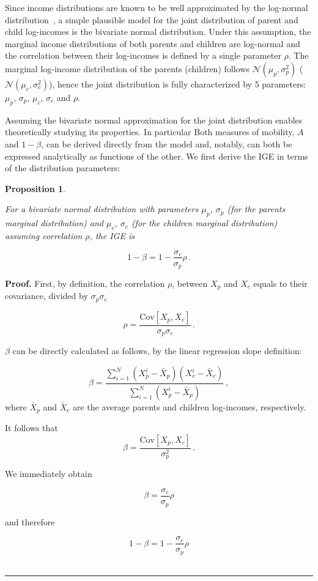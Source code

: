 \documentclass[prl,amsmath,twocolumn,nofootinbib]{revtex4}
\newcommand{\elabel}[1]{\label{eq:#1}}
\newcommand{\be}{\begin{equation}}
\newcommand{\ee}{\end{equation}}
\newtheorem{proposition}{Proposition}
\newenvironment{proof}[1][Proof]{\noindent\textbf{#1.} }{\ \rule{0.5em}{0.5em}}
\numberwithin{equation}{section}
\begin{document}
Since income distributions are known to be well approximated by the log-normal distribution~\cite{pinkovskiy2009parametric}, a simple plausible model for the joint distribution of parent and child log-incomes is the bivariate normal distribution. Under this assumption, the marginal income distributions of both parents and children are log-normal and the correlation between their log-incomes is defined by a single parameter $\rho$. The marginal log-income distribution of the parents (children) follows $\mathcal{N}\left(\mu_p,\sigma_p^2\right)$ ($\mathcal{N}\left(\mu_c,\sigma_c^2\right)$), hence the joint distribution is fully characterized by 5 parameters: $\mu_p$, $\sigma_p$, $\mu_c$, $\sigma_c$ and $\rho$.

Assuming the bivariate normal approximation for the joint distribution enables theoretically studying its properties. In particular Both measures of mobility, $A$ and $1-\beta$, can be derived directly from the model and, notably, can both be expressed analytically as functions of the other. We first derive the IGE in terms of the distribution parameters:

\begin{proposition}
\label{prop:prop1}

For a bivariate normal distribution with parameters $\mu_p$, $\sigma_p$ (for the parents marginal distribution) and $\mu_c$, $\sigma_c$ (for the children marginal distribution) assuming correlation $\rho$, the IGE is

\be
1-\beta = 1-\frac{\sigma_c}{\sigma_p}\rho \,.
\elabel{beta_rho}
\ee
\end{proposition}

\begin{proof}
First, by definition, the correlation $\rho$, between $X_p$ and $X_c$ equals to their covariance, divided by $\sigma_p\sigma_c$

\be
\rho = \frac{\text{Cov}\left[X_p,X_c\right]}{\sigma_p\sigma_c}\,.
\ee

$\beta$ can be directly calculated as follows, by the linear regression slope definition:

\be
\beta = \frac{\sum_{i=1}^{N} {\left(X_p^i - \bar{X}_p\right)\left(X_c^i - \bar{X}_c\right)}}{\sum_{i=1}^{N} {\left(X_p^i - \bar{X}_p\right)}}\,,
\ee
where $\bar{X}_p$ and $\bar{X}_c$ are the average parents and children log-incomes, respectively.

It follows that 
\be
\beta = \frac{\text{Cov}\left[X_p,X_c\right]}{\sigma_p^2}\,.
\ee

We immediately obtain

\be
\beta = \frac{\sigma_c}{\sigma_p}\rho
\ee

and therefore

\be
1-\beta = 1-\frac{\sigma_c}{\sigma_p}\rho
\ee
\end{proof}
\end{document}
